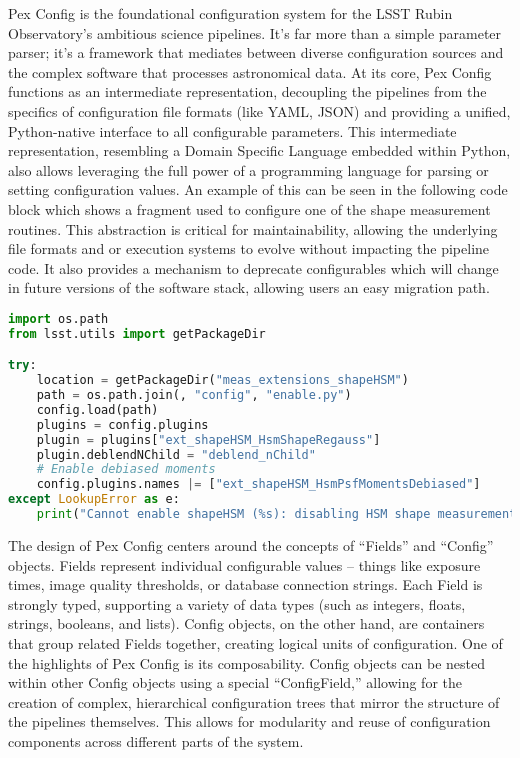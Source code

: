 Pex Config is the foundational configuration system for the LSST Rubin Observatory's ambitious science pipelines.
It's far more than a simple parameter parser; it's a framework that mediates between diverse configuration sources and the complex software that processes astronomical data.
At its core, Pex Config functions as an intermediate representation, decoupling the pipelines from the specifics of configuration file formats (like YAML, JSON) and providing a unified, Python-native interface to all configurable parameters.
This intermediate representation, resembling a Domain Specific Language embedded within Python, also allows leveraging the full power of a programming language for parsing or setting configuration values.
An example of this can be seen in the following code block which shows a fragment used to configure one of the shape measurement routines.
This abstraction is critical for maintainability, allowing the underlying file formats and or execution systems to evolve without impacting the pipeline code.
It also provides a mechanism to deprecate configurables which will change in future versions of the software stack, allowing users an easy migration path.

\begin{minipage}{\columnwidth}
    \begin{lstlisting}[caption=Code configuration in python, language=python]
import os.path
from lsst.utils import getPackageDir

try:
    location = getPackageDir("meas_extensions_shapeHSM")
    path = os.path.join(, "config", "enable.py")
    config.load(path)
    plugins = config.plugins
    plugin = plugins["ext_shapeHSM_HsmShapeRegauss"]
    plugin.deblendNChild = "deblend_nChild"
    # Enable debiased moments
    config.plugins.names |= ["ext_shapeHSM_HsmPsfMomentsDebiased"]
except LookupError as e:
    print("Cannot enable shapeHSM (%s): disabling HSM shape measurements" % (e,))
    \end{lstlisting}
\end{minipage}

The design of Pex Config centers around the concepts of ``Fields'' and ``Config'' objects.
Fields represent individual configurable values -- things like exposure times, image quality thresholds, or database connection strings.
Each Field is strongly typed, supporting a variety of data types (such as integers, floats, strings, booleans, and lists).
Config objects, on the other hand, are containers that group related Fields together, creating logical units of configuration.
One of the highlights of Pex Config is its composability.
Config objects can be nested within other Config objects using a special ``ConfigField,'' allowing for the creation of complex, hierarchical configuration trees that mirror the structure of the pipelines themselves.
This allows for modularity and reuse of configuration components across different parts of the system.


